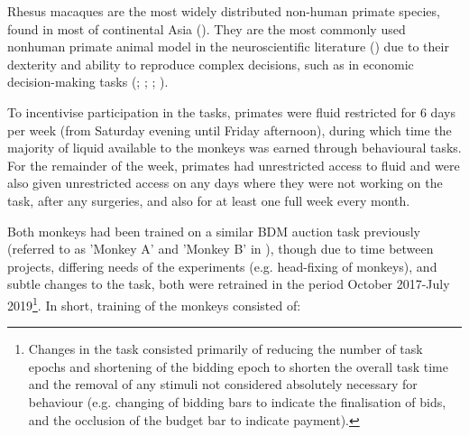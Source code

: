 Rhesus macaques are the most widely distributed non-human primate species, found in most of continental Asia (\cite{singhNonhumanPrimatesBiomedical2021}). They are the most commonly used nonhuman primate animal model in the neuroscientific literature (\cite{capitanioContributionsNonhumanPrimates2008}) due to their dexterity and ability to reproduce complex decisions, such as in economic decision-making tasks (\cite{ferraritonioloNonhumanPrimatesSatisfy2021}; \cite{fiorilloDiscreteCodingReward2003}; \cite{grabenhorstPredictionEconomicChoice2012}; \cite{padoaschioppaNeuronsOrbitofrontalCortex2006}).

To incentivise participation in the tasks, primates were fluid restricted for 6 days per week (from Saturday evening until Friday afternoon), during which time the majority of liquid available to the monkeys was earned through behavioural tasks. For the remainder of the week, primates had unrestricted access to fluid and were also given unrestricted access on any days where they were not working on the task, after any surgeries, and also for at least one full week every month.

Both monkeys had been trained on a similar BDM auction task previously (referred to as 'Monkey A' and 'Monkey B' in \cite{almohammadRewardValueRevealed2022}), though due to time between projects, differing needs of the experiments (e.g. head-fixing of monkeys), and subtle changes to the task, both were retrained in the period October 2017-July 2019\footnote{Changes in the task consisted primarily of reducing the number of task epochs and shortening of the bidding epoch to shorten the overall task time and the removal of any stimuli not considered absolutely necessary for behaviour (e.g. changing of bidding bars to indicate the finalisation of bids, and the occlusion of the budget bar to indicate payment).}. In short, training of the monkeys consisted of:

